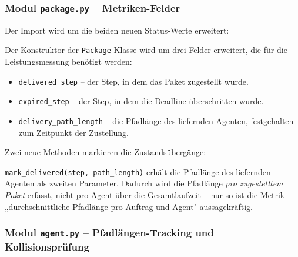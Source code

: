\subsubsection{Modul \texttt{package.py} – Metriken-Felder}

Der Import wird um die beiden neuen Status-Werte erweitert:



Der Konstruktor der \texttt{Package}-Klasse wird um drei Felder erweitert, die für die Leistungsmessung benötigt werden:



\begin{itemize}
    \item \texttt{delivered\_step} -- der Step, in dem das Paket zugestellt wurde.
    \item \texttt{expired\_step} -- der Step, in dem die Deadline überschritten wurde.
    \item \texttt{delivery\_path\_length} -- die Pfadlänge des liefernden Agenten, festgehalten zum Zeitpunkt der Zustellung.
\end{itemize}

Zwei neue Methoden markieren die Zustandsübergänge:



\texttt{mark\_delivered(step, path\_length)} erhält die Pfadlänge des liefernden Agenten als zweiten Parameter. Dadurch wird die Pfadlänge \textit{pro zugestelltem Paket} erfasst, nicht pro Agent über die Gesamtlaufzeit -- nur so ist die Metrik „durchschnittliche Pfadlänge pro Auftrag und Agent" aussagekräftig.


\subsubsection{Modul \texttt{agent.py} – Pfadlängen-Tracking und Kollisionsprüfung}

